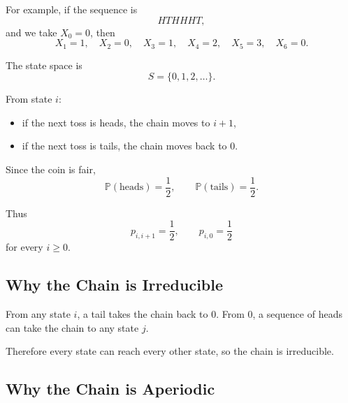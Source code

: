 \documentclass[12pt,a4paper]{article}
\theoremstyle{lecturestyle}
\newcommand{\Prob}{\mathbb{P}}
\begin{document}
For example, if the sequence is
\[
HTHHHT,
\]
and we take $X_0=0$, then
\[
X_1=1,\quad X_2=0,\quad X_3=1,\quad X_4=2,\quad X_5=3,\quad X_6=0.
\]

The state space is
\[
S=\{0,1,2,\ldots\}.
\]

From state $i$:
\begin{itemize}[leftmargin=1.2cm]
    \item if the next toss is heads, the chain moves to $i+1$,
    \item if the next toss is tails, the chain moves back to $0$.
\end{itemize}

Since the coin is fair,
\[
\Prob(\text{heads})=\frac12,
\qquad
\Prob(\text{tails})=\frac12.
\]

Thus
\[
p_{i,i+1}=\frac12,
\qquad
p_{i,0}=\frac12
\]
for every $i\geq0$.

\begin{center}
\end{center}

\subsection{Why the Chain is Irreducible}

From any state $i$, a tail takes the chain back to 0. From 0, a sequence of heads can take the chain to any state $j$.

Therefore every state can reach every other state, so the chain is irreducible.

\subsection{Why the Chain is Aperiodic}
\end{document}
